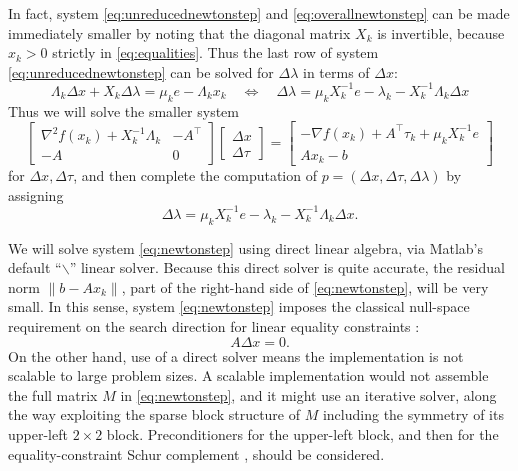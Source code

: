 \documentclass[11pt]{article}
\newcommand{\grad}{\nabla}
\begin{document}
In fact, system \eqref{eq:unreducednewtonstep} and \eqref{eq:overallnewtonstep} can be made immediately smaller by noting that the diagonal matrix $X_k$ is invertible, because $x_k>0$ strictly in \eqref{eq:equalities}.  Thus the last row of system \eqref{eq:unreducednewtonstep} can be solved for $\Delta\lambda$ in terms of $\Delta x$:
\begin{equation}
\Lambda_k\Delta x + X_k\Delta \lambda = \mu_k e - \Lambda_k x_k \quad \iff \quad
\Delta\lambda = \mu_k X_k^{-1} e - \lambda_k - X_k^{-1} \Lambda_k \Delta x \label{eq:solvefordlam}
\end{equation}
Thus we will solve the smaller system
\begin{equation}
\begin{bmatrix}
\grad^2 f(x_k) + X_k^{-1}\Lambda_k & -A^\top \\
-A             & 0
\end{bmatrix}
\begin{bmatrix}
\Delta x \\
\Delta \tau
\end{bmatrix}
=
\begin{bmatrix}
-\grad f(x_k) + A^\top \tau_k + \mu_k X_k^{-1} e \\
A x_k - b
\end{bmatrix} \label{eq:newtonstep}
\end{equation}
for $\Delta x,\Delta\tau$, and then complete the computation of $p=(\Delta x,\Delta\tau,\Delta\lambda)$ by assigning
\begin{equation}
\Delta\lambda = \mu_k X_k^{-1} e - \lambda_k - X_k^{-1} \Lambda_k \Delta x. \label{eq:newtonsteplam}
\end{equation}

We will solve system \eqref{eq:newtonstep} using direct linear algebra, via Matlab's default ``$\backslash$'' linear solver.  Because this direct solver is quite accurate, the residual norm $\|b-A x_k\|$, part of the right-hand side of \eqref{eq:newtonstep}, will be very small.  In this sense, system \eqref{eq:newtonstep} imposes the classical null-space requirement on the search direction for linear equality constraints \cite[chapter 3]{GrivaNashSofer2009}:
\begin{equation}
A \Delta x = 0.  \label{eq:dxnull}
\end{equation}
On the other hand, use of a direct solver means the implementation is not scalable to large problem sizes.  A scalable implementation would not assemble the full matrix $M$ in \eqref{eq:newtonstep}, and it might use an iterative solver, along the way exploiting the sparse block structure of $M$ including the symmetry of its upper-left $2\times 2$ block.  Preconditioners \cite{Bueler2021} for the upper-left block, and then for the equality-constraint Schur complement \cite[chapters 14]{Bueler2021}, should be considered.
\end{document}
